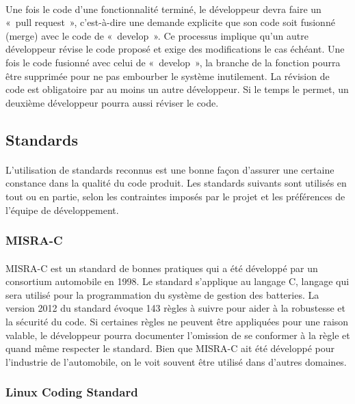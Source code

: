 	\paragraph{}
	Une fois le code d’une fonctionnalité terminé, le développeur devra faire un « pull request », c’est-à-dire une demande explicite que son code soit fusionné (merge) avec le code de « develop ». Ce processus implique qu’un autre développeur révise le code proposé et exige  des modifications le cas échéant. Une fois le code fusionné avec celui de « develop », la branche de la fonction pourra être supprimée pour ne pas embourber le système inutilement. La révision de code est obligatoire par au moins un autre développeur. Si le temps le permet, un deuxième développeur pourra aussi réviser le code.

	\subsection{Standards}
	\paragraph{}
	L’utilisation de standards reconnus est une bonne façon d’assurer une certaine constance dans la qualité du code produit. Les standards suivants sont utilisés en tout ou en partie, selon les contraintes imposés par le projet et les préférences de l’équipe de développement.

		\subsubsection{MISRA-C}
		\paragraph{}
		MISRA-C est un standard de bonnes pratiques qui a été développé par un consortium automobile en 1998. Le standard s’applique au langage C, langage qui sera utilisé pour la programmation du système de gestion des batteries. La version 2012 du standard évoque 143 règles à suivre pour aider à la robustesse et la sécurité du code. Si certaines règles ne peuvent être appliquées pour une raison valable, le développeur pourra documenter l’omission de se conformer à la règle et quand même respecter le standard. Bien que MISRA-C ait été développé pour l’industrie de l’automobile, on le voit souvent être utilisé dans d’autres domaines.

		\subsubsection{Linux Coding Standard}
